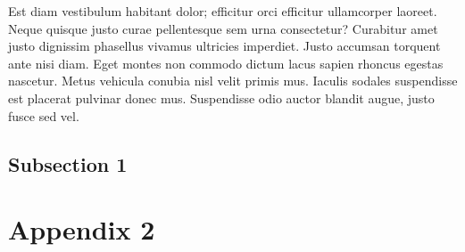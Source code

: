 Est diam vestibulum habitant dolor; efficitur orci efficitur ullamcorper
laoreet. Neque quisque justo curae pellentesque sem urna consectetur? Curabitur
amet justo dignissim phasellus vivamus ultricies imperdiet. Justo accumsan
torquent ante nisi diam. Eget montes non commodo dictum lacus sapien rhoncus
egestas nascetur. Metus vehicula conubia nisl velit primis mus. Iaculis sodales
suspendisse est placerat pulvinar donec mus. Suspendisse odio auctor blandit
augue, justo fusce sed vel.

\subsection{Subsection 1}

\section{Appendix 2}
